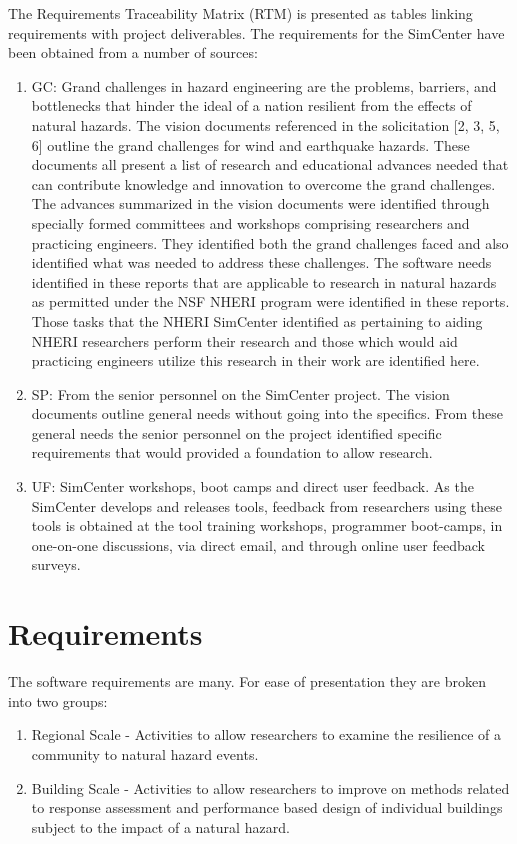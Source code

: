 \documentclass{simcenterdocumentation}
\begin{document}
The Requirements Traceability Matrix (RTM) is presented as tables linking requirements with project deliverables.  The requirements for the SimCenter have been obtained from a number of sources:
\begin{enumerate}
\item GC: Grand challenges in hazard engineering are the problems, barriers, and bottlenecks that hinder the ideal of a nation resilient from the effects of natural hazards. The vision documents referenced in the solicitation [2, 3, 5, 6] outline the grand challenges for wind and earthquake hazards. These documents all present a list of research and educational advances needed that can contribute knowledge and innovation to overcome the grand challenges. The advances summarized in the vision documents were identified through specially formed committees and workshops comprising researchers and practicing engineers. They identified both the grand challenges faced and also identified what was needed to address these challenges. The software needs identified in these reports that are applicable to research in natural hazards as permitted under the NSF NHERI program were identified in these reports. Those tasks that the NHERI SimCenter identified as pertaining to aiding NHERI researchers perform their research and those which would aid practicing engineers utilize this research in their work are identified here.
\item SP: From the senior personnel on the SimCenter project. The vision documents outline general needs without going into the specifics. From these general needs the senior personnel on the project  identified specific requirements  that would provided a foundation to allow research.
\item UF: SimCenter workshops, boot camps and direct user feedback. As the SimCenter develops and releases tools, feedback from researchers using these tools is obtained at the tool training workshops, programmer boot-camps,  in one-on-one discussions, via direct email, and through online user feedback surveys. 
\end{enumerate}  

\chapter{Requirements}
\label{chap:requirements}

The software requirements are many. For ease of presentation they are broken into two groups:
\begin{enumerate}
\item Regional Scale - Activities to allow researchers to examine the resilience of a community to natural hazard events.
\item Building Scale - Activities to allow researchers to improve on methods related to response assessment and performance based design of individual buildings subject to the impact of a natural hazard.
\end{enumerate}
\end{document}
